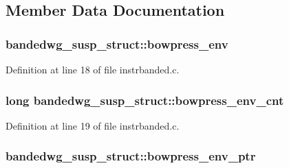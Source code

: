 \subsection{Member Data Documentation}
\subsubsection[{\texorpdfstring{bowpress\+\_\+env}{bowpress_env}}]{ bandedwg\+\_\+susp\+\_\+struct\+::bowpress\+\_\+env}\hypertarget{structbandedwg__susp__struct_a2d6d52b9e60ee2f13e01692490cacc96}{}\label{structbandedwg__susp__struct_a2d6d52b9e60ee2f13e01692490cacc96}


Definition at line 18 of file instrbanded.\+c.

\subsubsection[{\texorpdfstring{bowpress\+\_\+env\+\_\+cnt}{bowpress_env_cnt}}]{\setlength{\rightskip}{0pt plus 5cm}long bandedwg\+\_\+susp\+\_\+struct\+::bowpress\+\_\+env\+\_\+cnt}\hypertarget{structbandedwg__susp__struct_a5184b2d7af2a32fcca32b241b9931133}{}\label{structbandedwg__susp__struct_a5184b2d7af2a32fcca32b241b9931133}


Definition at line 19 of file instrbanded.\+c.

\subsubsection[{\texorpdfstring{bowpress\+\_\+env\+\_\+ptr}{bowpress_env_ptr}}]{ bandedwg\+\_\+susp\+\_\+struct\+::bowpress\+\_\+env\+\_\+ptr}\hypertarget{structbandedwg__susp__struct_a7c9b847439106692759bf2e770166f4b}{}\label{structbandedwg__susp__struct_a7c9b847439106692759bf2e770166f4b}



